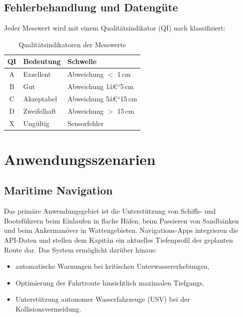 ﻿\documentclass[a4paper,12pt]{article}
\theoremstyle{definition}
\begin{document}
\subsection{Fehlerbehandlung und Datengüte}

Jeder Messwert wird mit einem Qualitätsindikator (QI) nach \cite{iho2020} klassifiziert:

\begin{table}[H]
\centering
\caption{Qualitätsindikatoren der Messwerte}
\label{tab:qualitaet}
\renewcommand{\arraystretch}{1.3}
\begin{tabular}{@{}cll@{}}
\toprule
\textbf{QI} & \textbf{Bedeutung} & \textbf{Schwelle} \\
\midrule
A & Exzellent & Abweichung $<$ 1\,cm \\
B & Gut & Abweichung 1â€“5\,cm \\
C & Akzeptabel & Abweichung 5â€“15\,cm \\
D & Zweifelhaft & Abweichung $>$ 15\,cm \\
X & Ungültig & Sensorfehler \\
\bottomrule
\end{tabular}
\end{table}

\section{Anwendungsszenarien}

\subsection{Maritime Navigation}

Das primäre Anwendungsgebiet ist die Unterstützung von Schiffs- und Bootsführern beim
Einlaufen in flache Häfen, beim Passieren von Sandbänken und beim Ankermanöver in
Wattengebieten. Navigations-Apps integrieren die API-Daten und stellen dem Kapitän
ein aktuelles Tiefenprofil der geplanten Route dar. Das System ermöglicht darüber hinaus:

\begin{itemize}
  \item automatische Warnungen bei kritischen Unterwassererhebungen,
  \item Optimierung der Fahrtroute hinsichtlich maximalen Tiefgangs,
  \item Unterstützung autonomer Wasserfahrzeuge (USV) bei der Kollisionsvermeidung.
\end{itemize}
\end{document}
